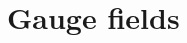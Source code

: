 \documentclass[11pt]{report}
\begin{document}
\setcounter{chapter}{5}

\chapter{Gauge fields}
\label{chap:lec5}

\end{document}
